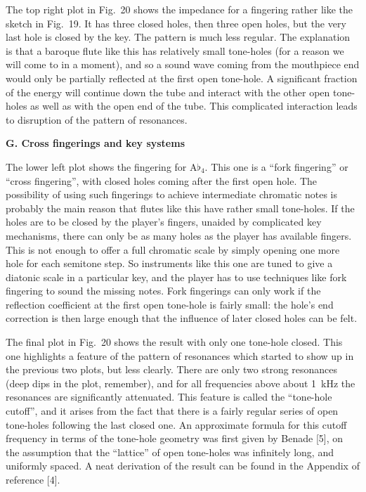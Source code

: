 



  The top right plot in Fig.\ 20 shows the impedance for a fingering rather 
  like the sketch in Fig.\ 19. It has three closed holes, then three open 
  holes, but the very last hole is closed by the key. The pattern is much less 
  regular. The explanation is that a baroque flute like this has relatively 
  small tone-holes (for a reason we will come to in a moment), and so a sound 
  wave coming from the mouthpiece end would only be partially reflected at the 
  first open tone-hole. A significant fraction of the energy will continue down 
  the tube and interact with the other open tone-holes as well as with the open 
  end of the tube. This complicated interaction leads to disruption of the 
  pattern of resonances. 

  \textbf{G. Cross fingerings and key systems} 

  The lower left plot shows the fingering for $\mathrm{A}\flat_4$. This one is 
  a “fork fingering” or “cross fingering”, with closed holes coming after the 
  first open hole. The possibility of using such fingerings to achieve 
  intermediate chromatic notes is probably the main reason that flutes like 
  this have rather small tone-holes. If the holes are to be closed by the 
  player’s fingers, unaided by complicated key mechanisms, there can only be as 
  many holes as the player has available fingers. This is not enough to offer a 
  full chromatic scale by simply opening one more hole for each semitone step. 
  So instruments like this one are tuned to give a diatonic scale in a 
  particular key, and the player has to use techniques like fork fingering to 
  sound the missing notes. Fork fingerings can only work if the reflection 
  coefficient at the first open tone-hole is fairly small: the hole's end 
  correction is then large enough that the influence of later closed holes can 
  be felt. 

  The final plot in Fig.\ 20 shows the result with only one tone-hole closed. 
  This one highlights a feature of the pattern of resonances which started to 
  show up in the previous two plots, but less clearly. There are only two 
  strong resonances (deep dips in the plot, remember), and for all frequencies 
  above about 1~kHz the resonances are significantly attenuated. This feature 
  is called the “tone-hole cutoff”, and it arises from the fact that there is a 
  fairly regular series of open tone-holes following the last closed one. An 
  approximate formula for this cutoff frequency in terms of the tone-hole 
  geometry was first given by Benade [5], on the assumption that the “lattice” 
  of open tone-holes was infinitely long, and uniformly spaced. A neat 
  derivation of the result can be found in the Appendix of reference [4]. 

